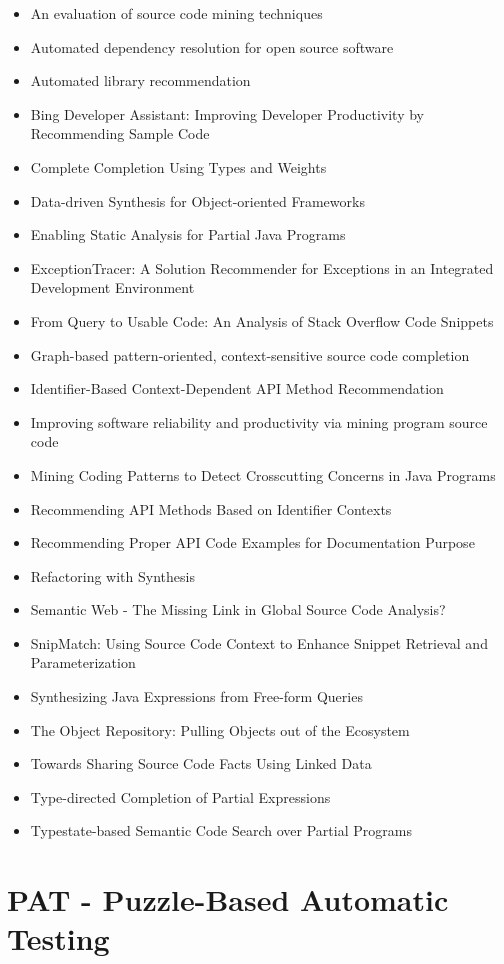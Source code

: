 \begin{itemize}
\item An evaluation of source code mining techniques
\item Automated dependency resolution for open source software
\item Automated library recommendation
\item Bing Developer Assistant: Improving Developer Productivity by Recommending Sample Code
\item Complete Completion Using Types and Weights
\item Data-driven Synthesis for Object-oriented Frameworks
\item Enabling Static Analysis for Partial Java Programs
\item ExceptionTracer: A Solution Recommender for Exceptions in an Integrated Development Environment
\item From Query to Usable Code: An Analysis of Stack Overflow Code Snippets
\item Graph-based pattern-oriented, context-sensitive source code completion
\item Identifier-Based Context-Dependent API Method Recommendation
\item Improving software reliability and productivity via mining program source code
\item Mining Coding Patterns to Detect Crosscutting Concerns in Java Programs
\item Recommending API Methods Based on Identifier Contexts
\item Recommending Proper API Code Examples for Documentation Purpose
\item Refactoring with Synthesis
\item Semantic Web - The Missing Link in Global Source Code Analysis?
\item SnipMatch: Using Source Code Context to Enhance Snippet Retrieval and Parameterization
\item Synthesizing Java Expressions from Free-form Queries
\item The Object Repository: Pulling Objects out of the Ecosystem
\item Towards Sharing Source Code Facts Using Linked Data
\item Type-directed Completion of Partial Expressions
\item Typestate-based Semantic Code Search over Partial Programs
\end{itemize}

\section{PAT - Puzzle-Based Automatic Testing}

